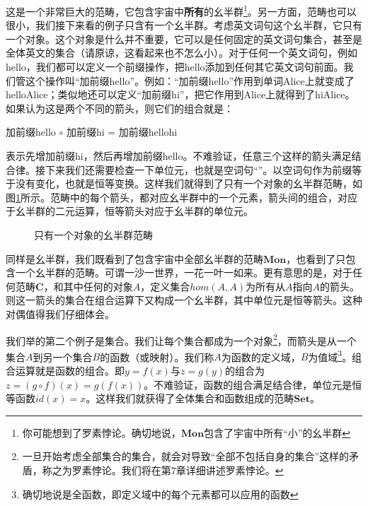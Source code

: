 \documentclass{article}
\begin{document}
这是一个非常巨大的范畴，它包含宇宙中\textbf{所有}的幺半群\footnote{你可能想到了罗素悖论。确切地说，$\pmb{Mon}$包含了宇宙中所有“小”的幺半群}。另一方面，范畴也可以很小，我们接下来看的例子只含有一个幺半群。考虑英文词句这个幺半群，它只有一个对象。这个对象是什么并不重要，它可以是任何固定的英文词句集合，甚至是全体英文的集合（请原谅，这看起来也不怎么小）。对于任何一个英文词句，例如hello，我们都可以定义一个前缀操作，把hello添加到任何其它英文词句前面。我们管这个操作叫“加前缀hello”。例如：“加前缀hello”作用到单词Alice上就变成了helloAlice；类似地还可以定义“加前缀hi”，把它作用到Alice上就得到了hiAlice。如果认为这是两个不同的箭头，则它们的组合就是：

\begin{center}
加前缀hello $\circ$ 加前缀hi = 加前缀hellohi
\end{center}

表示先增加前缀hi，然后再增加前缀hello。不难验证，任意三个这样的箭头满足结合律。接下来我们还需要检查一下单位元，也就是空词句“”。以空词句作为前缀等于没有变化，也就是恒等变换。这样我们就得到了只有一个对象的幺半群范畴，如图\ref{fig:monoid-as-category}所示。范畴中的每个箭头，都对应幺半群中的一个元素，箭头间的组合，对应于幺半群的二元运算，恒等箭头对应于幺半群的单位元。

\begin{figure}[htbp]
\centering
{}
\caption{只有一个对象的幺半群范畴}
\label{fig:monoid-as-category}
\end{figure}

同样是幺半群，我们既看到了包含宇宙中全部幺半群的范畴$\pmb{Mon}$，也看到了只包含一个幺半群的范畴。可谓一沙一世界，一花一叶一如来。更有意思的是，对于任何范畴$\pmb{C}$，和其中任何的对象$A$，定义集合$hom(A, A)$为所有从$A$指向$A$的箭头。则这一箭头的集合在组合运算下又构成一个幺半群，其中单位元是恒等箭头。这种对偶值得我们仔细体会。

我们举的第二个例子是集合。我们让每个集合都成为一个对象\footnote{一旦开始考虑全部集合的集合，就会对导致“全部不包括自身的集合”这样的矛盾，称之为罗素悖论。我们将在第7章详细讲述罗素悖论。}，而箭头是从一个集合$A$到另一个集合$B$的函数（或映射）。我们称$A$为函数的定义域，$B$为值域\footnote{确切地说是全函数，即定义域中的每个元素都可以应用的函数}。组合运算就是函数的组合。即$y = f(x)$与$z = g(y)$的组合为$z = (g \circ f)(x) = g(f(x))$。不难验证，函数的组合满足结合律，单位元是恒等函数$id(x) = x$。这样我们就获得了全体集合和函数组成的范畴$\pmb{Set}$。
\end{document}
